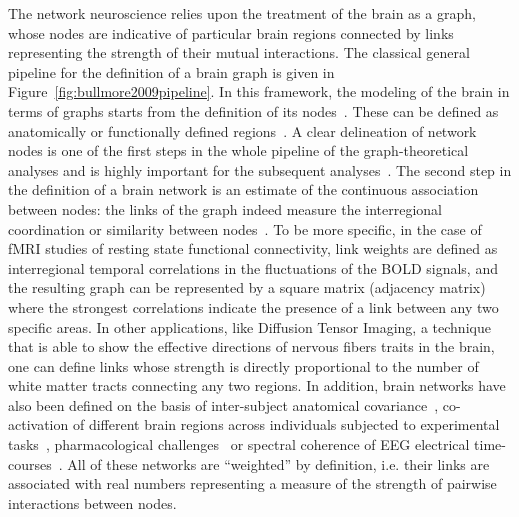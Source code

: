The network neuroscience relies upon the treatment of the brain as a graph, whose nodes are indicative of particular brain regions connected by links representing  the strength of their mutual interactions.
The classical general pipeline for the definition of a brain graph is given in Figure~\ref{fig:bullmore2009pipeline}.
In this framework, the modeling of the brain in terms of graphs starts from the definition of its nodes~\cite{stanley2013}.
These can be defined as anatomically or functionally defined regions~\cite{vandenheuvel2010}.
A clear delineation of network nodes is one of the first steps in the whole pipeline of the graph-theoretical analyses and is highly important for the subsequent analyses~\cite{stanley2013}.
The second step in the definition of a brain network is an estimate of the continuous association between nodes: the links of the graph indeed measure the interregional coordination or similarity between nodes~\cite{pereda2005a}.
To be more specific, in the case of fMRI studies of resting state functional connectivity, link weights are defined as interregional temporal correlations in the fluctuations of the BOLD signals, and the resulting graph can be represented by a square matrix (adjacency matrix) where the strongest correlations indicate the presence of a link between any two specific areas.
In other applications, like Diffusion Tensor Imaging, a technique that is able to show the effective directions of nervous fibers traits in the brain, one can define links whose strength is directly proportional to the number of white matter tracts connecting any two regions.
In addition, brain networks have also been defined on the basis of inter-subject anatomical covariance~\cite{evans2013,he2007}, co-activation of different brain regions across individuals subjected to experimental tasks~\cite{crossley2013a}, pharmacological challenges~\cite{schwarz2007,schwarz2008} or spectral coherence of EEG electrical time-courses~\cite{pereda2005a}.
All of these networks are ``weighted'' by definition, i.e.
their links are associated with real numbers representing a measure of the strength of pairwise interactions between nodes.

